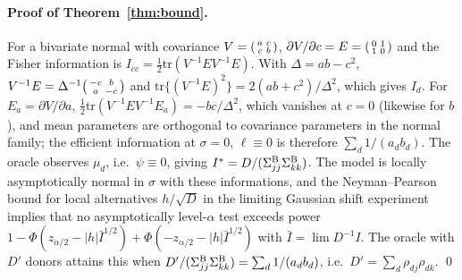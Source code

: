 \paragraph{Proof of Theorem~\ref{thm:bound}.}
For a bivariate normal with covariance $V=\begin{psmallmatrix}a&c\\c&b\end{psmallmatrix}$, $\partial V/\partial c=E=\begin{psmallmatrix}0&1\\1&0\end{psmallmatrix}$ and the Fisher information is $I_{cc}=\tfrac12\mathrm{tr}(V^{-1}EV^{-1}E)$. With $\Delta=ab-c^2$, $V^{-1}E=\Delta^{-1}\begin{psmallmatrix}-c&b\\a&-c\end{psmallmatrix}$ and $\mathrm{tr}\{(V^{-1}E)^2\}=2(ab+c^2)/\Delta^2$, which gives $I_d$. For $E_a=\partial V/\partial a$, $\tfrac12\mathrm{tr}(V^{-1}EV^{-1}E_a)=-bc/\Delta^2$, which vanishes at $c=0$ (likewise for $b$), and mean parameters are orthogonal to covariance parameters in the normal family; the efficient information at $\sigma=0$, $\ell\equiv0$ is therefore $\sum_d1/(a_db_d)$. The oracle observes $\mu_d$, i.e.\ $\psi\equiv0$, giving $I^\ast=D/(\Sigma^{\mathrm{B}}_{jj}\Sigma^{\mathrm{B}}_{kk})$. The model is locally asymptotically normal in $\sigma$ with these informations, and the Neyman--Pearson bound for local alternatives $h/\sqrt D$ in the limiting Gaussian shift experiment \citep[ch.~15]{vanderVaart1998} implies that no asymptotically level-$\alpha$ test exceeds power $1-\Phi(z_{\alpha/2}-|h|\bar I^{1/2})+\Phi(-z_{\alpha/2}-|h|\bar I^{1/2})$ with $\bar I=\lim D^{-1}I$. The oracle with $D'$ donors attains this when $D'/(\Sigma^{\mathrm{B}}_{jj}\Sigma^{\mathrm{B}}_{kk})=\sum_d1/(a_db_d)$, i.e.\ $D'=\sum_d\rho_{dj}\rho_{dk}$. \qed

